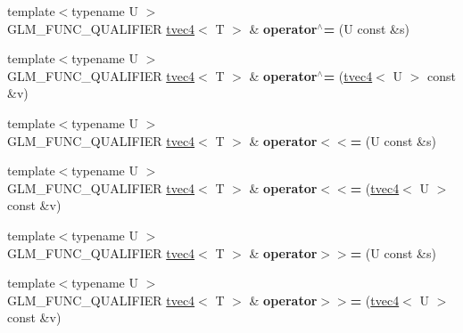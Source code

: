 \begin{DoxyCompactItemize}
\item 
\hypertarget{structglm_1_1detail_1_1tvec4_aaac80b76e60f293836cc4fe823a5bb2a}{{\footnotesize template$<$typename U $>$ }\\G\-L\-M\-\_\-\-F\-U\-N\-C\-\_\-\-Q\-U\-A\-L\-I\-F\-I\-E\-R \hyperlink{structglm_1_1detail_1_1tvec4}{tvec4}$<$ T $>$ \& {\bfseries operator$^\wedge$=} (U const \&s)}\label{structglm_1_1detail_1_1tvec4_aaac80b76e60f293836cc4fe823a5bb2a}

\item 
\hypertarget{structglm_1_1detail_1_1tvec4_ad9a6686cce4a8538d309670511a42f8e}{{\footnotesize template$<$typename U $>$ }\\G\-L\-M\-\_\-\-F\-U\-N\-C\-\_\-\-Q\-U\-A\-L\-I\-F\-I\-E\-R \hyperlink{structglm_1_1detail_1_1tvec4}{tvec4}$<$ T $>$ \& {\bfseries operator$^\wedge$=} (\hyperlink{structglm_1_1detail_1_1tvec4}{tvec4}$<$ U $>$ const \&v)}\label{structglm_1_1detail_1_1tvec4_ad9a6686cce4a8538d309670511a42f8e}

\item 
\hypertarget{structglm_1_1detail_1_1tvec4_abcccdf85cc0ba74ff62f55e9fe289724}{{\footnotesize template$<$typename U $>$ }\\G\-L\-M\-\_\-\-F\-U\-N\-C\-\_\-\-Q\-U\-A\-L\-I\-F\-I\-E\-R \hyperlink{structglm_1_1detail_1_1tvec4}{tvec4}$<$ T $>$ \& {\bfseries operator$<$$<$=} (U const \&s)}\label{structglm_1_1detail_1_1tvec4_abcccdf85cc0ba74ff62f55e9fe289724}

\item 
\hypertarget{structglm_1_1detail_1_1tvec4_a502c2ad52eebe3e35e39c3209d55ce77}{{\footnotesize template$<$typename U $>$ }\\G\-L\-M\-\_\-\-F\-U\-N\-C\-\_\-\-Q\-U\-A\-L\-I\-F\-I\-E\-R \hyperlink{structglm_1_1detail_1_1tvec4}{tvec4}$<$ T $>$ \& {\bfseries operator$<$$<$=} (\hyperlink{structglm_1_1detail_1_1tvec4}{tvec4}$<$ U $>$ const \&v)}\label{structglm_1_1detail_1_1tvec4_a502c2ad52eebe3e35e39c3209d55ce77}

\item 
\hypertarget{structglm_1_1detail_1_1tvec4_a61576671c163d89728eafa5adf25598b}{{\footnotesize template$<$typename U $>$ }\\G\-L\-M\-\_\-\-F\-U\-N\-C\-\_\-\-Q\-U\-A\-L\-I\-F\-I\-E\-R \hyperlink{structglm_1_1detail_1_1tvec4}{tvec4}$<$ T $>$ \& {\bfseries operator$>$$>$=} (U const \&s)}\label{structglm_1_1detail_1_1tvec4_a61576671c163d89728eafa5adf25598b}

\item 
\hypertarget{structglm_1_1detail_1_1tvec4_a767cc5a96867c44d95f7d971e40e5903}{{\footnotesize template$<$typename U $>$ }\\G\-L\-M\-\_\-\-F\-U\-N\-C\-\_\-\-Q\-U\-A\-L\-I\-F\-I\-E\-R \hyperlink{structglm_1_1detail_1_1tvec4}{tvec4}$<$ T $>$ \& {\bfseries operator$>$$>$=} (\hyperlink{structglm_1_1detail_1_1tvec4}{tvec4}$<$ U $>$ const \&v)}\label{structglm_1_1detail_1_1tvec4_a767cc5a96867c44d95f7d971e40e5903}

\end{DoxyCompactItemize}
